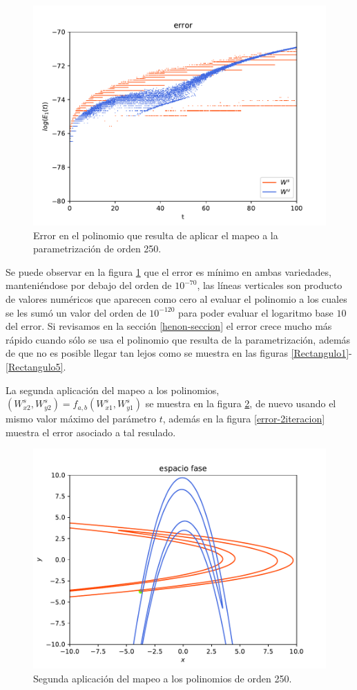 \begin{figure}[h]
\centering
\includegraphics[scale=0.6]{error1ite}
\caption{Error en el polinomio que resulta de aplicar el mapeo a la parametrización de orden 250.}
\label{error-1iteracion}
\end{figure}
Se puede observar en la figura \ref{error-1iteracion} que el error es mínimo en ambas variedades, manteniéndose por debajo del orden de $10^{-70}$, las líneas verticales son producto de valores numéricos que aparecen como cero al evaluar el polinomio a los cuales se les sumó un valor del orden de $10^{-120}$ para poder evaluar el logaritmo base $10$ del error. Si revisamos en la sección \ref{henon-seccion} el error crece mucho más rápido cuando sólo se usa el polinomio que resulta de la parametrización, además de que no es posible llegar tan lejos como se muestra en las figuras \ref{Rectangulo1}-\ref{Rectangulo5}.

La segunda aplicación del mapeo a los polinomios, $(W_{x2}^{s},W_{y2}^{s})=f_{a,b}(W_{x1}^{s},W_{y1}^{s})$ se muestra en la figura \ref{Rectangulo2}, de nuevo usando el mismo valor máximo del parámetro $t$, además en la figura \ref{error-2iteracion} muestra el error asociado a tal resulado.
\begin{figure}[H]
\centering
\includegraphics[scale=0.6]{rectangulo2}
\caption{Segunda aplicación del mapeo a los polinomios de orden 250.}
\label{Rectangulo2}
\end{figure}

